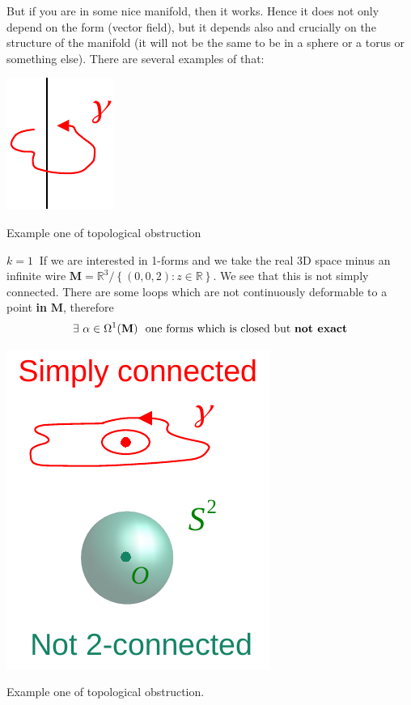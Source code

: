 \documentclass[../main.tex]{subfiles}
\begin{document}
But if you are in some nice manifold, then it works. Hence it does not only depend on the form (vector field), but it depends also and crucially on the structure of the manifold (it will not be the same to be in a sphere or a torus or something else). There are several examples of that:
\begin{marginfigure}[-10mm]
    \centering
	\includegraphics[width=0.5\linewidth]{images/ex1_topol_obstruction.pdf}
	\caption{Example one of topological obstruction}
\end{marginfigure}
\begin{example}
$\boxed{k=1}\ $ If we are interested in 1-forms and we take the real 3D space minus an infinite wire $\mathbf{M}=\mathbb{R}^3\slash \left\{\left(0,0,2\right): z\in\mathbb{R}\right\}$. We see that this is not simply connected. There are some loops which are not continuously deformable to a point \textbf{in} $\mathbf{M}$, therefore \[\exists \ \alpha \in \Omega^1(\mathbf{M})\ \textrm{ one forms which is closed but \textbf{not exact}}\]
\end{example}
\begin{marginfigure}[-10mm]
    \centering
	\includegraphics[width=0.6\linewidth]{images/ex2_topol_obstruction.pdf}
	\caption{Example one of topological obstruction.}
\end{marginfigure}
\end{document}
